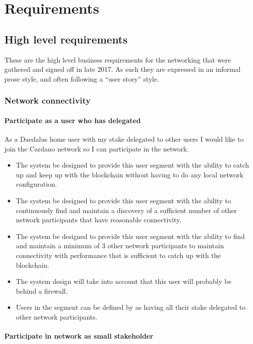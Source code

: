 \documentclass{report}
\theoremstyle{definition}{
  \newtheorem{lemma}{Lemma}[section] %
  \newtheorem{definition}[lemma]{Definition}
}
\theoremstyle{theorem}{
  \newtheorem{invariant}[lemma]{Invariant}
  \newtheorem{proofobligation}[lemma]{Proof Obligation}
}
\numberwithin{equation}{lemma}
\begin{document}
\section{Requirements}
\subsection{High level requirements}

These are the high level business requirements for the networking that were
gathered and signed off in late 2017. As such they are expressed in an informal
prose style, and often following a ``user story'' style.

\subsubsection{Network connectivity}

\paragraph{Participate as a user who has delegated}

As a Daedalus home user with my stake delegated to other users I would like to
join the Cardano network so I can participate in the network.
\begin{itemize}
\item The system be designed to provide this user segment with the ability
      to catch up and keep up with the blockchain without having to do any local
      network configuration.
\item The system be designed to provide this user segment with the ability to
      continuously find and maintain a discovery of a sufficient number of
      other network participants that have reasonable connectivity.
\item The system be designed to provide this user segment with the ability to
      find and maintain a minimum of 3 other network participants to maintain
      connectivity with performance that is sufficient to catch up with the
      blockchain.
\item The system design will take into account that this user will probably be
      behind a firewall.
\item Users in the segment can be defined by as having all their stake
      delegated to other network participants.
\end{itemize}


\paragraph{Participate in network as small stakeholder}
\end{document}
